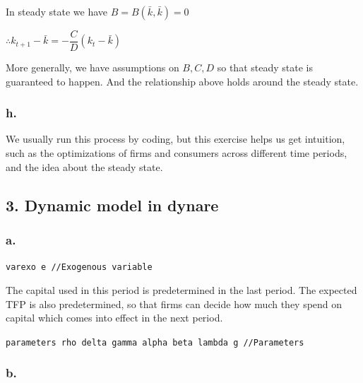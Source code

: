 \documentclass{article}
\begin{document}
In steady state we have $B=B\left(\bar{k},\bar{k}\right)=0$

$\therefore k_{t+1}-\bar{k}=-\dfrac{C}{D}\left(k_{t}-\bar{k}\right)$

More generally, we have assumptions on $B,C,D$ so that steady state is guaranteed to happen. And the relationship above holds around the steady state.

\subsubsection*{\textrm{h.}}

We usually run this process by coding, but this exercise helps us get intuition, such as the optimizations of firms and consumers across different time periods, and the idea about the steady state. 

\subsection*{\textrm{3. Dynamic model in dynare}}

\subsubsection*{\textrm{a.}}

\texttt{varexo e //Exogenous variable}

The capital used in this period is predetermined in the last period. The expected TFP is also predetermined, so that firms can decide how much they spend on capital which comes into effect in the next period.

\texttt{parameters rho delta gamma alpha beta lambda g //Parameters}

\subsubsection*{\textrm{b.}}
\end{document}
